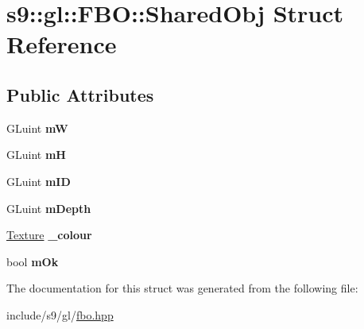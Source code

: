 \hypertarget{structs9_1_1gl_1_1FBO_1_1SharedObj}{\section{s9\-:\-:gl\-:\-:F\-B\-O\-:\-:Shared\-Obj Struct Reference}
\label{structs9_1_1gl_1_1FBO_1_1SharedObj}
}
\subsection*{Public Attributes}
\begin{DoxyCompactItemize}
\item 
\hypertarget{structs9_1_1gl_1_1FBO_1_1SharedObj_a1769db4f71c3aabfebc3d272143dc27c}{G\-Luint {\bfseries m\-W}}\label{structs9_1_1gl_1_1FBO_1_1SharedObj_a1769db4f71c3aabfebc3d272143dc27c}

\item 
\hypertarget{structs9_1_1gl_1_1FBO_1_1SharedObj_a7e37881e9449deac72414da64b9482d5}{G\-Luint {\bfseries m\-H}}\label{structs9_1_1gl_1_1FBO_1_1SharedObj_a7e37881e9449deac72414da64b9482d5}

\item 
\hypertarget{structs9_1_1gl_1_1FBO_1_1SharedObj_aed218d736734e682410d189841843bbc}{G\-Luint {\bfseries m\-I\-D}}\label{structs9_1_1gl_1_1FBO_1_1SharedObj_aed218d736734e682410d189841843bbc}

\item 
\hypertarget{structs9_1_1gl_1_1FBO_1_1SharedObj_a8f81f21a29c6364e54a7aa3f29a2e8b9}{G\-Luint {\bfseries m\-Depth}}\label{structs9_1_1gl_1_1FBO_1_1SharedObj_a8f81f21a29c6364e54a7aa3f29a2e8b9}

\item 
\hypertarget{structs9_1_1gl_1_1FBO_1_1SharedObj_a6c95f7df608290573e56d7378ac98943}{\hyperlink{classs9_1_1gl_1_1Texture}{Texture} {\bfseries \-\_\-colour}}\label{structs9_1_1gl_1_1FBO_1_1SharedObj_a6c95f7df608290573e56d7378ac98943}

\item 
\hypertarget{structs9_1_1gl_1_1FBO_1_1SharedObj_a1efa7049eb9b8f72cefd4980ad5c1535}{bool {\bfseries m\-Ok}}\label{structs9_1_1gl_1_1FBO_1_1SharedObj_a1efa7049eb9b8f72cefd4980ad5c1535}

\end{DoxyCompactItemize}


The documentation for this struct was generated from the following file\-:\begin{DoxyCompactItemize}
\item 
include/s9/gl/\hyperlink{fbo_8hpp}{fbo.\-hpp}\end{DoxyCompactItemize}
